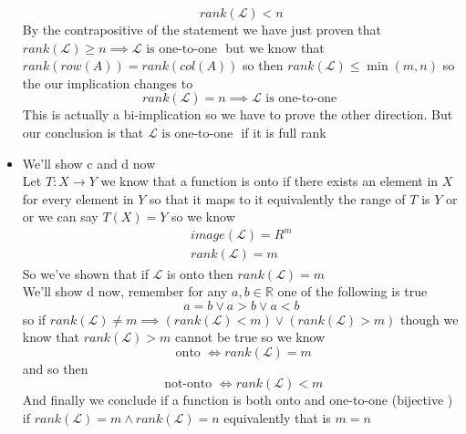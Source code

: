 \documentclass[11pt]{book}
\begin{document}
\begin{itemize}
    \[
    \boxed{\mathit{rank} \left(\mathcal{L} \right) < n}
    \]
    By the contrapositive of the statement we have just proven that $\mathit{rank} \left(\mathcal{L} \right) \ge n \implies \mathcal{L} \text{ is one-to-one  } $ but we know that $\mathit{rank} \left(row\left(A\right) \right) = \mathit{rank} \left(col\left( A \right)  \right) $ so then $\mathit{rank} \left(\mathcal{L} \right) \le \min\left(m, n\right) $ so the our implication changes to 
    \[
    \mathit{rank} \left(\mathcal{L} \right) = n \implies \mathcal{L} \text{ is one-to-one  } 
    \]
    This is actually a bi-implication so we have to prove the other direction. But our conclusion is that $\mathcal{L} \text{ is one-to-one  } $ if it is full rank
    \item We'll show c and d now\\
    Let $T : X \to Y $ we know that a function is onto if there exists an element in $X$ for every element in $Y$ so that it maps to it equivalently the range of $T$ is $Y$ or or we can say $T\left(X\right) = Y$ so we know
    \begin{gather*}
        image\left(\mathcal{L} \right) = R^{m} \\
        \mathit{rank} \left(\mathcal{L} \right) = m
    \end{gather*}
    So we've shown that if $\mathcal{L} $ is onto then $\mathit{rank} \left(\mathcal{L} \right) = m$ \\
    We'll show d now, remember for any $a, b \in \mathbb{R} $ one of the following is true
    \[
    a= b\lor a > b \lor a < b
    \]
    so if $\mathit{rank} \left(\mathcal{L} \right) \neq m \implies \left( \mathit{rank} \left(\mathcal{L} \right) < m \right) \lor \left( \mathit{rank} \left(\mathcal{L} \right) > m \right) $ though we know that $\mathit{rank} \left(\mathcal{L} \right) > m$ cannot be true so we know
    \[
    \text{ onto } \Leftrightarrow \mathit{rank} \left(\mathcal{L} \right) = m
    \]
    and so then 
    \[
    \text{ not-onto } \Leftrightarrow \mathit{rank} \left(\mathcal{L} \right) < m
    \]
    And finally we conclude if a function is both onto and one-to-one (bijective ) if $\mathit{rank} \left(\mathcal{L} \right) = m \land \mathit{rank} \left(\mathcal{L} \right) = n$ equivalently that is $m= n$ 
\end{itemize}




\end{document}

